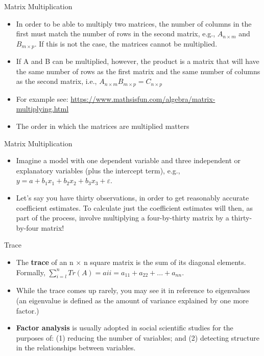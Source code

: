 \documentclass[
  ignorenonframetext,
]{beamer}
\begin{document}
\begin{frame}{Matrix Multiplication}
\protect\hypertarget{matrix-multiplication}{}

\begin{itemize}
\item
  In order to be able to multiply two matrices, the number of columns in
  the first must match the number of rows in the second matrix, e.g.,
  \(A_{n×m}\) and \(B_{m×p}\). If this is not the case, the matrices
  cannot be multiplied.
\item
  If A and B can be multiplied, however, the product is a matrix that
  will have the same number of rows as the first matrix and the same
  number of columns as the second matrix, i.e.,
  \(A_{n×m}B_{m×p} = C_{n×p}\)
\item
  For example see:
  \url{https://www.mathsisfun.com/algebra/matrix-multiplying.html}
\item
  The order in which the matrices are multiplied matters
\end{itemize}

\end{frame}

\begin{frame}{Matrix Multiplication}
\protect\hypertarget{matrix-multiplication-1}{}

\begin{itemize}
\item
  Imagine a model with one dependent variable and three independent or
  explanatory variables (plus the intercept term), e.g.,
  \(y = a + b_{1}x_{1} + b_{2}x_{2} + b_{3}x_{3} + ε\).
\item
  Let's say you have thirty observations, in order to get reasonably
  accurate coefficient estimates. To calculate just the coefficient
  estimates will then, as part of the process, involve multiplying a
  four-by-thirty matrix by a thirty-by-four matrix!
\end{itemize}

\end{frame}

\begin{frame}{Trace}
\protect\hypertarget{trace}{}

\begin{itemize}
\item
  The \textbf{trace} of an n × n square matrix is the sum of its
  diagonal elements. Formally,
  \(\sum_{i=l}^{n}Tr(A) = aii = a_{11} + a_{22} + . . . + a_{nn}\).
\item
  While the trace comes up rarely, you may see it in reference to
  eigenvalues (an eigenvalue is defined as the amount of variance
  explained by one more factor.)
\item
  \textbf{Factor analysis} is usually adopted in social scientific
  studies for the purposes of: (1) reducing the number of variables; and
  (2) detecting structure in the relationships between variables.
\end{itemize}

\end{frame}
\end{document}
